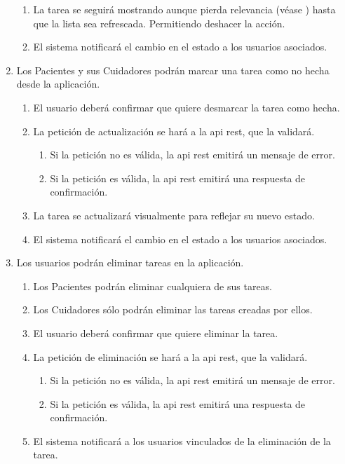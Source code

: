 \begin{enumerate}[label*=RGT \arabic*.]
\begin{enumerate}[label*=\arabic*.]
        \item La tarea se seguirá mostrando aunque pierda relevancia (véase ) hasta que la lista sea refrescada. Permitiendo deshacer la acción.
        \item \label{req:noti_tarea_hecha} El sistema notificará el cambio en el estado a los usuarios asociados.
    \end{enumerate}
    \item \label{req:marcar_tarea_no_hecha} Los Pacientes y sus Cuidadores podrán marcar una tarea como no hecha desde la aplicación.
    \begin{enumerate}[label*=\arabic*.]
        \item El usuario deberá confirmar que quiere desmarcar la tarea como hecha.
        \item La petición de actualización se hará a la \acrshort{api} \acrshort{rest}, que la validará.
        \begin{enumerate}[label*=\arabic*.]
            \item Si la petición no es válida, la \acrshort{api} \acrshort{rest} emitirá un mensaje de error.
            \item Si la petición es válida, la \acrshort{api} \acrshort{rest} emitirá una respuesta de confirmación.
        \end{enumerate}
        \item La tarea se actualizará visualmente para reflejar su nuevo estado.
        \item \label{req:noti_tarea_no_hecha} El sistema notificará el cambio en el estado a los usuarios asociados.
    \end{enumerate}
    \item \label{req:eliminar_tarea} Los usuarios podrán eliminar tareas en la aplicación.
    \begin{enumerate}[label*=\arabic*.]
        \item Los Pacientes podrán eliminar cualquiera de sus tareas.
        \item Los Cuidadores sólo podrán eliminar las tareas creadas por ellos.
        \item El usuario deberá confirmar que quiere eliminar la tarea.
        \item La petición de eliminación se hará a la \acrshort{api} \acrshort{rest}, que la validará.
        \begin{enumerate}[label*=\arabic*.]
            \item Si la petición no es válida, la \acrshort{api} \acrshort{rest} emitirá un mensaje de error.
            \item Si la petición es válida, la \acrshort{api} \acrshort{rest} emitirá una respuesta de confirmación.
        \end{enumerate}
        \item \label{req:noti_tarea_eliminada} El sistema notificará a los usuarios vinculados de la eliminación de la tarea.
    \end{enumerate}
\end{enumerate}

